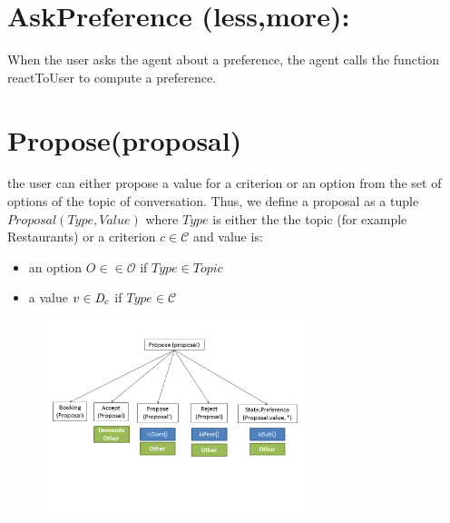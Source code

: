 \documentclass{llncs}
\begin{document}
%

\section{AskPreference (less,more): } 
		When the user asks the agent about a preference, the agent calls the function reactToUser to compute a preference.
		
\section{Propose(proposal)}
	the user can either propose a value for a criterion or an option from the set of options of the topic of conversation. Thus, we define a proposal as a tuple $Proposal(Type, Value)$ where  $Type$ is either the the topic (for example Restaurants) or a criterion $c \in \mathcal{C}$ and value is:
	\begin{itemize}
		\item an option $O \in \in \mathcal{O}$ if $Type \in Topic$ 
		\item a value $v \in \emph{D}_c$ if $Type \in \mathcal{C}$
	\end{itemize}
	  \begin{figure}[]
	  						\centerline{\includegraphics[width=3in]{figs/utterances_v2/Diapositive2.PNG}}
	  						\vskip 8pt
	  	\end{figure}
\end{document}
